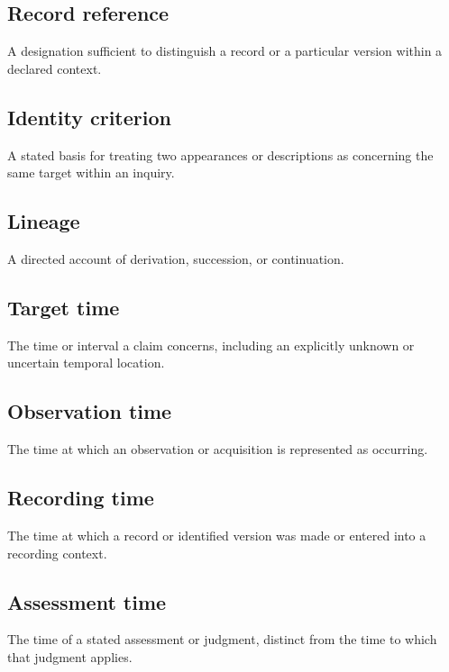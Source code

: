 \documentclass[11pt,a4paper]{article}
\begin{document}
\subsection{Record reference}
A designation sufficient to distinguish a record or a particular version within a declared context.

\subsection{Identity criterion}
A stated basis for treating two appearances or descriptions as concerning the same target within an inquiry.

\subsection{Lineage}
A directed account of derivation, succession, or continuation.

\subsection{Target time}
The time or interval a claim concerns, including an explicitly unknown or uncertain temporal location.

\subsection{Observation time}
The time at which an observation or acquisition is represented as occurring.

\subsection{Recording time}
The time at which a record or identified version was made or entered into a recording context.

\subsection{Assessment time}
The time of a stated assessment or judgment, distinct from the time to which that judgment applies.
\end{document}
